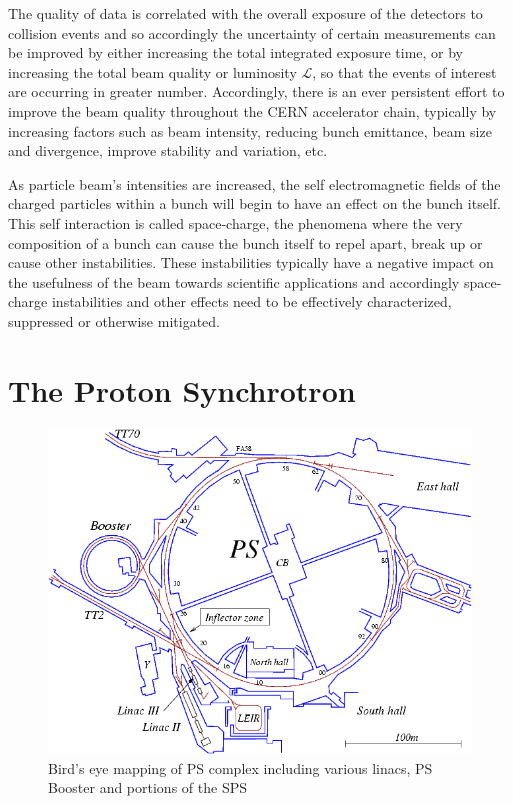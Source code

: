 The quality of data is correlated with the overall exposure of the detectors to collision events and so accordingly the uncertainty of certain measurements can be improved by either increasing the total integrated exposure time, or by increasing the total beam quality or luminosity $\mathcal{L}$, so that the events of interest are occurring in greater number. Accordingly, there is an ever persistent effort to improve the beam quality throughout the CERN accelerator chain, typically by increasing factors such as beam intensity, reducing bunch emittance, beam size and divergence, improve stability and variation, etc.

As particle beam's intensities are increased, the self electromagnetic fields of the charged particles within a bunch will begin to have an effect on the bunch itself. This self interaction is called space-charge, the phenomena where the very composition of a bunch can cause the bunch itself to repel apart, break up or cause other instabilities. These instabilities typically have a negative impact on the usefulness of the beam towards scientific applications and accordingly space-charge instabilities and other effects need to be effectively characterized, suppressed or otherwise mitigated.

\section{The Proton Synchrotron}

\begin{figure}
    \centering
    \includegraphics{figs/pscomplex.png}
    \caption{Bird's eye mapping of PS complex including various linacs, PS Booster and portions of the SPS}
    \label{fig:my_label}
\end{figure}

